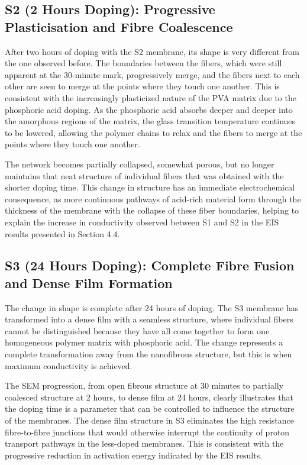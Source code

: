 \documentclass[12pt,a4paper]{report}
\begin{document}
\subsection{S2 (2 Hours Doping): Progressive Plasticisation and Fibre Coalescence}
After two hours of doping with the S2 membrane, its shape is very different from the one observed before. The boundaries between the fibers, which were still apparent at the 30-minute mark, progressively merge, and the fibers next to each other are seen to merge at the points where they touch one another. This is consistent with the increasingly plasticized nature of the PVA matrix due to the phosphoric acid doping. As the phosphoric acid absorbs deeper and deeper into the amorphous regions of the matrix, the glass transition temperature continues to be lowered, allowing the polymer chains to relax and the fibers to merge at the points where they touch one another.\cite{4,35}

The network becomes partially collapsed, somewhat porous, but no longer maintains that neat structure of individual fibers that was obtained with the shorter doping time. This change in structure has an immediate electrochemical consequence, as more continuous pathways of acid-rich material form through the thickness of the membrane with the collapse of these fiber boundaries, helping to explain the increase in conductivity observed between S1 and S2 in the EIS results presented in Section 4.4.\cite{52, 58}

\subsection{S3 (24 Hours Doping): Complete Fibre Fusion and Dense Film Formation}
The change in shape is complete after 24 hours of doping. The S3 membrane has transformed into a dense film with a seamless structure, where individual fibers cannot be distinguished because they have all come together to form one homogeneous polymer matrix with phosphoric acid. The change represents a complete transformation away from the nanofibrous structure, but this is when maximum conductivity is achieved.\cite{52,58}

The SEM progression, from open fibrous structure at 30 minutes to partially coalesced structure at 2 hours, to dense film at 24 hours, clearly illustrates that the doping time is a parameter that can be controlled to influence the structure of the membranes. The dense film structure in S3 eliminates the high resistance fibre-to-fibre junctions that would otherwise interrupt the continuity of proton transport pathways in the less-doped membranes. This is consistent with the progressive reduction in activation energy indicated by the EIS results.\cite{35,52,58}
\end{document}
